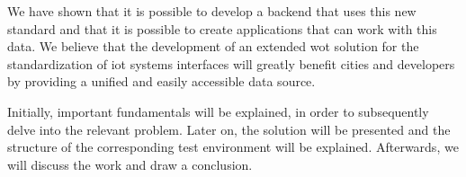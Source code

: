 We have shown that it is possible to develop a backend that uses this new standard and that it is possible to create applications that can work with this data.
We believe that the development of an extended \gls{wot} solution for the standardization of \gls{iot} systems interfaces will greatly benefit cities and developers by providing a unified and easily accessible data source.

Initially, important fundamentals will be explained, in order to subsequently delve into the relevant problem.
Later on, the solution will be presented and the structure of the corresponding test environment will be explained.
Afterwards, we will discuss the work and draw a conclusion.
